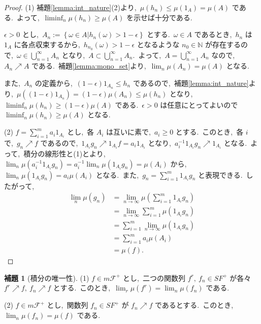 \documentclass[a4j,11pt]{jarticle}
\theoremstyle{definition}
\newtheorem{lemma}[theorem]{補題}
\begin{document}
\begin{proof}
  (1)
  補題\ref{lemma:int_nature}(2)より,\ 
  $\mu(h_n) \leq \mu(1_A) = \mu(A)$
  である.\ 
  よって,\ 
  $\liminf_{n} \mu(h_n) \geq \mu(A)$
  を示せば十分である.\ 

  $\epsilon > 0$
  とし,\ 
  $A_n := \left\{\omega \in A | h_n(\omega) > 1-\epsilon \right\}$
  とする.\ 
  $\omega \in A$
  であるとき,\ 
  $h_n$
  は
  $1_{A}$
  に各点収束するから,\ 
  $h_{n_0}(\omega) > 1 - \epsilon$
  となるような
  $n_0 \in \mathbb{N}$
  が存在するので,\ 
  $\omega \in \bigcup_{n=1}^{\infty} A_n$
  となり,\ 
  $A \subset \bigcup_{n=1}^{\infty} A_n$.\ 
  よって,\ 
  $A = \bigcup_{n=1}^{\infty} A_n$
  なので,\ 
  $A_n \nearrow A$
  である.\ 
  補題\ref{lemma:mono_set}より,\ 
  $\lim_n \mu(A_n) = \mu(A)$
  となる.\ 

  また,\ 
  $A_n$
  の定義から,\ 
  $(1-\epsilon)1_{A_n} \leq h_n$
  であるので,\ 補題\ref{lemma:int_nature}より,\ 
  $\mu((1-\epsilon)1_{A_n}) = (1-\epsilon)\mu(A_n) \leq \mu(h_n)$
  となり,\ 
  $\liminf_n \mu(h_n) \geq (1-\epsilon) \mu(A)$
  である.\ 
  $\epsilon>0$
  は任意にとってよいので
  $\liminf_n \mu(h_n) \geq \mu(A)$
  となる.\ 

  (2)
  $f = \sum_{i=1}^m a_i 1_{A_i}$
  とし,\ 
  各
  $A_i$
  は互いに素で,\ 
  $a_i \geq 0$
  とする.\ 
  このとき,\ 各
  $i$
  で,\ 
  $g_n \nearrow f$
  であるので,\ 
  $1_{A_i}g_n \nearrow 1_{A_i}f = a_i 1_{A_i}$
  となり,\ 
  $a_i^{-1}1_{A_i}g_n \nearrow 1_{A_i}$
  となる.\ 
  よって,\ 積分の線形性と(1)とより,\ 
  $\lim_n \mu(a_i^{-1}1_{A_i}g_n) = a_i^{-1} \lim_n \mu(1_{A_i}g_n) = \mu(A_i)$
  から,\ 
  $\lim_n \mu(1_{A_i}g_n) = a_i \mu(A_i)$
  となる.\ 
  また,\ 
  $g_n = \sum_{i=1}^m 1_{A_i}g_n$
  と表現できる.\ 
  したがって,\ 
  \begin{align}
    \lim_n \mu(g_n)
    & = \lim_{n \to \infty} \mu\left(\sum_{i=1}^m 1_{A_i}g_n \right) \\
    & = \lim_{n \to \infty} \sum_{i=1}^m \mu(1_{A_i}g_n) \\
    & = \sum_{i=1}^m \lim_{n \to \infty} \mu(1_{A_i}g_n) \\
    & = \sum_{i=1}^m a_i \mu(A_i) \\
    & = \mu(f).
  \end{align}
\end{proof}

\begin{lemma}[積分の唯一性]\label{lemma:int_unique}
  \mbox{}
  (1)
  $f \in m\mathcal{F}^+$
  とし,\ 
  二つの関数列
  $f^r,\ f_n \in SF^+$
  が各々
  $f^r \nearrow f,\ f_n \nearrow f$
  とする.\ 
  このとき,\ 
  $\lim_r \mu\left( f^r\right) = \lim_n \mu\left( f_n\right)$
  である.\ 

  (2)
  $f \in m\mathcal{F}^+$
  とし,\ 関数列
  $f_n \in SF^+$
  が
  $f_n \nearrow f$
  であるとする.\ 
  このとき,\ 
  $\lim_n \mu(f_n) = \mu(f)$
  である.\ 
\end{lemma}
\end{document}
